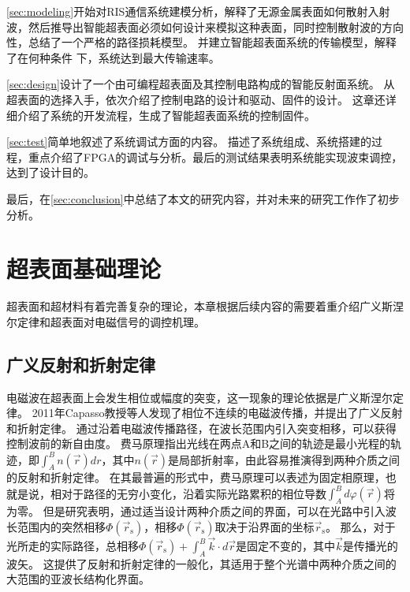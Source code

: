 \documentclass[supercite]{HustGraduPaper}
\begin{document}
\autoref{sec:modeling}开始对RIS通信系统建模分析，解释了无源金属表面如何散射入射波，然后推导出智能超表面必须如何设计来模拟这种表面，同时控制散射波的方向性，总结了一个严格的路径损耗模型。
并建立智能超表面系统的传输模型，解释了在何种条件
下，系统达到最大传输速率。

\autoref{sec:design}设计了一个由可编程超表面及其控制电路构成的智能反射面系统。
从超表面的选择入手，依次介绍了控制电路的设计和驱动、固件的设计。
这章还详细介绍了系统的开发流程，生成了智能超表面系统的控制固件。

\autoref{sec:test}简单地叙述了系统调试方面的内容。
描述了系统组成、系统搭建的过程，重点介绍了FPGA的调试与分析。最后的测试结果表明系统能实现波束调控，达到了设计目的。

最后，在\autoref{sec:conclusion}中总结了本文的研究内容，并对未来的研究工作作了初步分析。

\section{超表面基础理论}\label{sec:theory}

超表面和超材料有着完善复杂的理论，本章根据后续内容的需要着重介绍广义斯涅尔定律和超表面对电磁信号的调控机理。

\subsection{广义反射和折射定律}\label{subsec:snell-law}

电磁波在超表面上会发生相位或幅度的突变，这一现象的理论依据是广义斯涅尔定律\cite{9326394}。
2011年Capasso教授等人发现了相位不连续的电磁波传播，并提出了广义反射和折射定律\cite{yu2011light}。
通过沿着电磁波传播路径，在波长范围内引入突变相移，可以获得控制波前的新自由度。
费马原理指出光线在两点A和B之间的轨迹是最小光程的轨迹，即$ \int_{A}^{B} n(\vec{r}) dr $，其中$ n(\vec{r}) $是局部折射率，由此容易推演得到两种介质之间的反射和折射定律。
在其最普遍的形式中，费马原理可以表述为固定相原理\cite{feynman2010quantum}，也就是说，相对于路径的无穷小变化，沿着实际光路累积的相位导数$ \int_{A}^{B} d \varphi (\vec{r}) $将为零。
但是研究表明，通过适当设计两种介质之间的界面，可以在光路中引入波长范围内的突然相移$ \Phi (\vec{r}_\mathrm{s}) $，相移$ \Phi (\vec{r}_\mathrm{s}) $取决于沿界面的坐标$ \vec{r}_\mathrm{s} $。
那么，对于光所走的实际路径，总相移$ \Phi\left(\vec{r}_{\mathrm{s}}\right)+\int_{A}^{B} \vec{k} \cdot d \vec{r} $是固定不变的，其中$ \vec{k} $是传播光的波矢。
这提供了反射和折射定律的一般化，其适用于整个光谱中两种介质之间的大范围的亚波长结构化界面。
\end{document}
